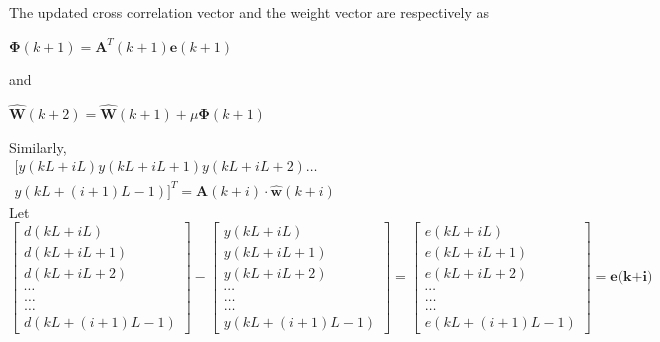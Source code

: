 \documentclass[conference]{IEEEtran}
\begin{document}
The updated cross correlation vector and the weight vector are respectively as
\begin{center}
$\mathbf{\Phi}(k+1)=\mathbf{A}^{T}(k+1) \mathbf{e}(k+1)$
\end{center}
and
\begin{center}
$\hat{\mathbf{W}}(k+2)=\hat{\mathbf{W}}(k+1)+\mu \mathbf{\Phi}(k+1)$
\end{center}
Similarly,\\
$\begin{array}{c}{[y(k L+i L) y(k L+i L+1) y(k L+i L+2) \ldots} \\ {y(k L+(i+1) L-1) ]^{T}=\mathbf{A}(k+i) \cdot \hat{\mathbf{w}}(k+i)}\end{array}$\\
Let\\
$\left[ \begin{array}{l}{d(k L+i L)} \\ {d(k L+i L+1)} \\ {d(k L+i L+2)} \\ {\cdots} \\ {\ldots} \\ {\ldots} \\ {d(k L+(i+1) L-1)}\end{array}\right] - \left[ \begin{array}{l}{y(k L+i L)} \\ {y(k L+i L+1)} \\ {y(k L+i L+2)} \\ {\cdots} \\ {\ldots} \\ {\ldots} \\ {y(k L+(i+1) L-1)}\end{array}\right] = \left[ \begin{array}{l}{e(k L+i L)} \\ {e(k L+i L+1)} \\ {e(k L+i L+2)} \\ {\cdots} \\ {\ldots} \\ {\ldots} \\ {e(k L+(i+1) L-1)}\end{array}\right] = \textbf{e(k+i)}$ \\
\end{document}
